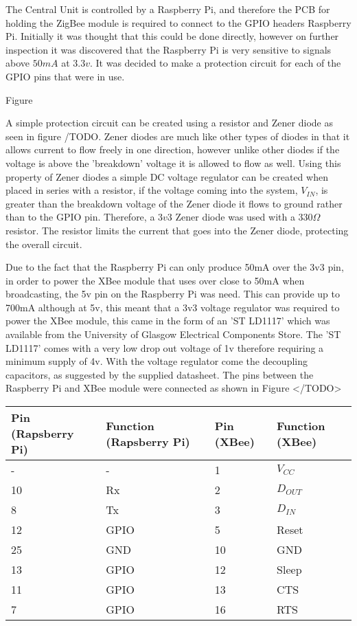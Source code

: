 The Central Unit is controlled by a Raspberry Pi, and therefore the PCB for holding the ZigBee module is required to connect to the GPIO headers Raspberry Pi.  Initially it was thought that this could be done directly, however on further inspection it was discovered that the Raspberry Pi is very sensitive to signals above \(50mA\) at \(3.3v\). It was decided to make a protection circuit for each of the GPIO pins that were in use. 

Figure

A simple protection circuit can be created using a resistor and Zener diode as seen in figure /TODO.  Zener diodes are much like other types of diodes in that it allows current to flow freely in one direction, however unlike other diodes if the voltage is above the 'breakdown' voltage it is allowed to flow as well. Using this property of Zener diodes a simple DC voltage regulator can be created when placed in series with a resistor, if the voltage coming into the system, \(V_{IN}\), is greater than the breakdown voltage of the Zener diode it flows to ground rather than to the GPIO pin. Therefore, a \(3v3\) Zener diode was used with a \(330\Omega\) resistor. The resistor limits the current that goes into the Zener diode, protecting the overall circuit.

Due to the fact that the Raspberry Pi can only produce 50mA over the 3v3 pin, in order to power the XBee module that uses over close to 50mA when broadcasting, the 5v pin on the Raspberry Pi was need. This can provide up to 700mA although at 5v, this meant that a 3v3 voltage regulator was required to power the XBee module, this came in the form of an 'ST LD1117' which was available from the University of Glasgow Electrical Components Store. The 'ST LD1117' comes with a very low drop out voltage of 1v therefore requiring a minimum supply of 4v. With the voltage regulator come the decoupling capacitors, as suggested by the supplied datasheet.
The pins between the Raspberry Pi and XBee module were connected as shown in Figure </TODO>

\begin{center}
  \begin{tabular}{| l | l | l | l |}
    \hline
    \bf{Pin (Rapsberry Pi)} & \bf{Function (Rapsberry Pi)} & \bf{Pin (XBee)} & \bf{Function (XBee)} \\ \hline
     - & - & 1 & \(V_{CC}\) \\ \hline
	10 & Rx & 2 & \(D_{OUT}\) \\ \hline
	8 & Tx & 3 & \(D_{IN}\) \\ \hline
	12 & GPIO & 5 & Reset \\ \hline
	25 & GND & 10 & GND \\ \hline
	13 & GPIO & 12 & Sleep \\ \hline
	11 & GPIO & 13 & CTS \\ \hline
	7 & GPIO & 16 & RTS \\ \hline
    \hline
  \end{tabular}
\end{center}

